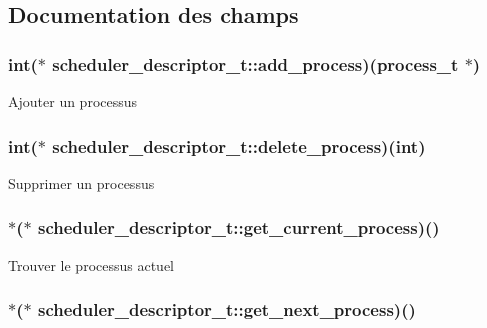 \subsection{Documentation des champs}
\hypertarget{structscheduler__descriptor__t_a8919a05ae907a4b642563078a28e744a}{
\subsubsection[{add\-\_\-process}]{\setlength{\rightskip}{0pt plus 5cm}int($\ast$ scheduler\-\_\-descriptor\-\_\-t\-::add\-\_\-process)({\bf process\-\_\-t} $\ast$)}}\label{structscheduler__descriptor__t_a8919a05ae907a4b642563078a28e744a}
Ajouter un processus \hypertarget{structscheduler__descriptor__t_a656d41ddd8d861d0ee55523de3693dfa}{
\subsubsection[{delete\-\_\-process}]{\setlength{\rightskip}{0pt plus 5cm}int($\ast$ scheduler\-\_\-descriptor\-\_\-t\-::delete\-\_\-process)(int)}}\label{structscheduler__descriptor__t_a656d41ddd8d861d0ee55523de3693dfa}
Supprimer un processus \hypertarget{structscheduler__descriptor__t_a077b3b95ecf49c9dacc40b6a87cb1008}{
\subsubsection[{get\-\_\-current\-\_\-process}]{$\ast$($\ast$ scheduler\-\_\-descriptor\-\_\-t\-::get\-\_\-current\-\_\-process)()}}\label{structscheduler__descriptor__t_a077b3b95ecf49c9dacc40b6a87cb1008}
Trouver le processus actuel \hypertarget{structscheduler__descriptor__t_a41661a5080062b563df01dfb1a02e22e}{
\subsubsection[{get\-\_\-next\-\_\-process}]{$\ast$($\ast$ scheduler\-\_\-descriptor\-\_\-t\-::get\-\_\-next\-\_\-process)()}}\label{structscheduler__descriptor__t_a41661a5080062b563df01dfb1a02e22e}
